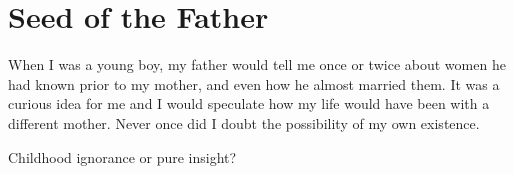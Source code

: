 \section{Seed of the Father}

When I was a young boy, my father would tell me once or twice about women he had known prior to my mother, and even how he almost married them. It was a curious idea for me and I would speculate how my life would have been with a different mother. Never once did I doubt the possibility of my own existence.

Childhood ignorance or pure insight?


